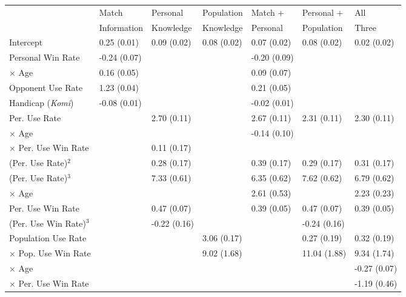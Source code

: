 \begin{table}
  \centering
  \begin{footnotesize}
    \begin{tabular}{lllllll}
	\hline
    \hline
	     & Match & Personal    &  Population   & Match +  & Personal +  & All  \\
          & Information    & Knowledge    &  Knowledge   & Personal   & Population  & Three \\
    \hline
   	Intercept & 0.25 (0.01) & 0.09 (0.02) & 0.08 (0.02) & 0.07 (0.02) & 0.08 (0.02) & 0.02 (0.02) \\
    Personal Win Rate & -0.24 (0.07) &       &       & -0.20 (0.09) &       &  \\
    $\times$ Age & 0.16 (0.05) &       &       & 0.09 (0.07) &       &  \\
    Opponent Use Rate & 1.23 (0.04) &       &       & 0.21 (0.05) &       &  \\
    Handicap (\textit{Komi}) & -0.08 (0.01) &       &       & -0.02 (0.01) &       &  \\
    Per. Use Rate &       & 2.70 (0.11) &       & 2.67 (0.11) & 2.31 (0.11) & 2.30 (0.11) \\
	$\times$ Age  &       &       &       & -0.14 (0.10) &       &  \\
    $\times$ Per. Use Win Rate &       & 0.11 (0.17) &       &       &       &  \\
    (Per. Use Rate)$^2$ &       & 0.28 (0.17) &       & 0.39 (0.17) & 0.29 (0.17) & 0.31 (0.17) \\
    (Per. Use Rate)$^3$ &       & 7.33 (0.61) &       & 6.35 (0.62) & 7.62 (0.62) & 6.79 (0.62) \\
    $\times$ Age &       &       &       & 2.61 (0.53) &       &  2.23 (0.23) \\
    Per. Use Win Rate &       & 0.47 (0.07) &       & 0.39 (0.05) & 0.47 (0.07) & 0.39 (0.05) \\
    (Per. Use Win Rate)$^3$ &       & -0.22 (0.16) &       &       & -0.24 (0.16) &  \\
    Population Use Rate &       &       & 3.06 (0.17) &       & 0.27 (0.19) & 0.32 (0.19) \\
    $\times$ Pop. Use Win Rate &       &       & 9.02 (1.68) &       & 11.04 (1.88) & 9.34 (1.74) \\
    $\times$ Age &       &       &       &       &       & -0.27 (0.07) \\
    $\times$ Per. Use Win Rate &       &       &       &       &       & -1.19 (0.46) \\

\end{tabular}
\end{footnotesize}
\end{table}
